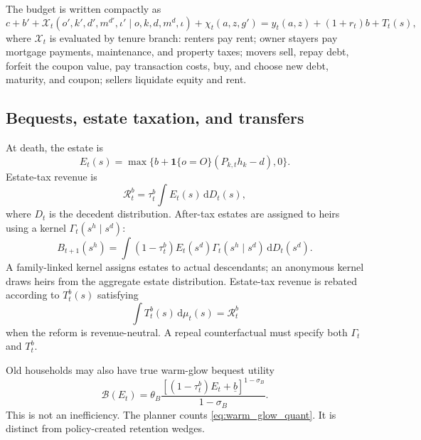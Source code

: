 \documentclass[11pt]{article}
\newcommand{\dd}{\mathrm d}
\newcommand{\1}{\mathbf 1}
\begin{document}
The budget is written compactly as
\begin{equation}
c+b'+\mathcal X_t(o',k',d',m^{d\prime},\iota'\mid o,k,d,m^d,\iota)+\chi_t(a,z,g')=y_t(a,z)+(1+r_t)b+T_t(s),
\label{eq:budget_quant}
\end{equation}
where $\mathcal X_t$ is evaluated by tenure branch: renters pay rent; owner stayers pay mortgage payments, maintenance, and property taxes; movers sell, repay debt, forfeit the coupon value, pay transaction costs, buy, and choose new debt, maturity, and coupon; sellers liquidate equity and rent.

\subsection{Bequests, estate taxation, and transfers}

At death, the estate is
\begin{equation}
E_t(s)=\max\{b+\1\{o=O\}(P_{k,t}h_k-d),0\}.
\end{equation}
Estate-tax revenue is
\begin{equation}
\mathcal R_t^b=\tau_t^b\int E_t(s)\,\dd D_t(s),
\label{eq:estate_tax_revenue_quant}
\end{equation}
where $D_t$ is the decedent distribution. After-tax estates are assigned to heirs using a kernel $\Gamma_t(s^h\mid s^d)$:
\begin{equation}
B_{t+1}(s^h)=\int (1-\tau_t^b)E_t(s^d)\Gamma_t(s^h\mid s^d)\,\dd D_t(s^d).
\label{eq:inheritance_kernel_quant}
\end{equation}
A family-linked kernel assigns estates to actual descendants; an anonymous kernel draws heirs from the aggregate estate distribution. Estate-tax revenue is rebated according to $T_t^b(s)$ satisfying
\begin{equation}
\int T_t^b(s)\,\dd\mu_t(s)=\mathcal R_t^b
\label{eq:estate_rebate_quant}
\end{equation}
when the reform is revenue-neutral. A repeal counterfactual must specify both $\Gamma_t$ and $T_t^b$.

Old households may also have true warm-glow bequest utility
\begin{equation}
\mathcal B(E_t)=\theta_B\frac{\left[(1-\tau_t^b)E_t+\underline b\right]^{1-\sigma_B}}{1-\sigma_B}.
\label{eq:warm_glow_quant}
\end{equation}
This is not an inefficiency. The planner counts \eqref{eq:warm_glow_quant}. It is distinct from policy-created retention wedges.
\end{document}
